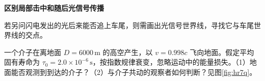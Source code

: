 \begin{solution}
\par\medskip{}\noindent\textbf{区别局部击中和随后光信号传播}\par\nobreak
若另问闪电发出的光后来能否追上车尾，则需画出光信号世界线，寻找它与车尾世界线的交点。
\end{solution}

\begin{question}
\begin{example}[高空产生的介子能否到达地面]\label{ex:hr7}
一个介子在离地面 $D=6000\,\mathrm m$ 的高空产生，以 $v=0.998c$ 飞向地面。假定平均固有寿命为 $\tau_0=2.0\times10^{-6}\,\mathrm s$，按指数规律衰变，忽略运动中的能量损失。（1）地面能否观测到到达的介子？（2）与介子共动的观察者如何判断？见图\ref{fig:hr7q}。
\end{example}
\end{question}

